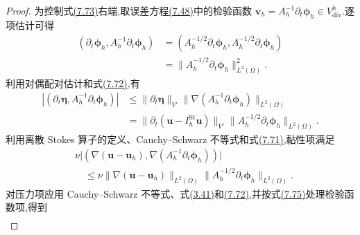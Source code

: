 \begin{proof}
为控制式\hyperref[eq:time-dependent-pressure-error-time-derivative-negative-norm]{(7.73)}右端,取误差方程\hyperref[eq:time-dependent-fem-error-equation]{(7.48)}中的检验函数
$\bm{v}_h=A_h^{-1}\partial_t\symbf{\phi}_h\in V_{\mathrm{div}}^h$.逐项估计可得
\begin{equation}\label{eq:time-dependent-pressure-error-time-derivative-test}
\begin{aligned}
  (\partial_t\symbf{\phi}_h,
       A_h^{-1}\partial_t\symbf{\phi}_h)
  &=(A_h^{-1/2}\partial_t\symbf{\phi}_h,
       A_h^{-1/2}\partial_t\symbf{\phi}_h)\\
  &=\|A_h^{-1/2}\partial_t\symbf{\phi}_h\|_{L^2(\Omega)}^2.
\end{aligned}
\end{equation}
利用对偶配对估计和式\hyperref[eq:time-dependent-pressure-error-discrete-stokes-negative-norm]{(7.72)},有
\begin{equation}\label{eq:time-dependent-pressure-error-time-derivative-projection-test}
\begin{aligned}
  |(\partial_t\symbf{\eta},A_h^{-1}\partial_t\symbf{\phi}_h)|
  &\le \|\partial_t\symbf{\eta}\|_{V'}
       \|\nabla(A_h^{-1}\partial_t\symbf{\phi}_h)\|_{L^2(\Omega)}\\
  &=\|\partial_t(\bm{u}-I_h^{\mathrm{St}}\bm{u})\|_{V'}
       \|A_h^{-1/2}\partial_t\symbf{\phi}_h\|_{L^2(\Omega)}.
\end{aligned}
\end{equation}
利用离散 Stokes 算子的定义、Cauchy--Schwarz 不等式和式\hyperref[eq:time-dependent-pressure-error-discrete-stokes-norm]{(7.71)},黏性项满足
\begin{equation}\label{eq:time-dependent-pressure-error-viscous-test}
\begin{aligned}
  &\nu\bigl|(\nabla(\bm{u}-\bm{u}_h),
       \nabla(A_h^{-1}\partial_t\symbf{\phi}_h))\bigr|\\
  &\quad\le \nu\|\nabla(\bm{u}-\bm{u}_h)\|_{L^2(\Omega)}
       \|A_h^{-1/2}\partial_t\symbf{\phi}_h\|_{L^2(\Omega)}.
\end{aligned}
\end{equation}
对压力项应用 Cauchy--Schwarz 不等式、式\hyperref[eq:divergence-gradient-bound-h01]{(3.41)}和\hyperref[eq:time-dependent-pressure-error-discrete-stokes-negative-norm]{(7.72)},并按式\hyperref[eq:time-dependent-pressure-error-time-derivative-projection-test]{(7.75)}处理检验函数项,得到
\begin{equation}\label{eq:time-dependent-pressure-error-pressure-test}
\begin{aligned}

\end{aligned}
\end{equation}
\end{proof}
